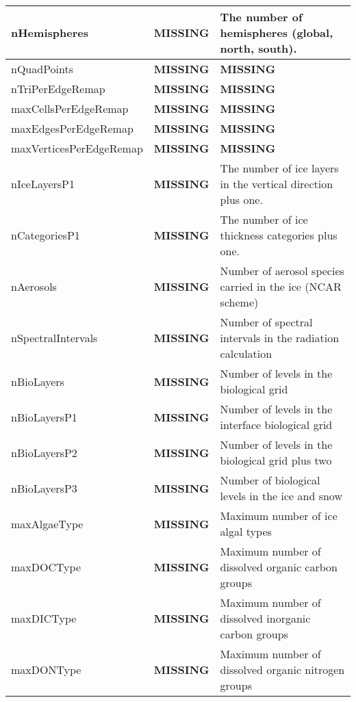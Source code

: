 {\begin{center}
\begin{longtable}{| p{1.0in} || p{1.0in} | p{4.0in} |}
    nHemispheres & {\bf \color{red} MISSING} & The number of hemispheres (global, north, south). \\ 
    \hline
    nQuadPoints & {\bf \color{red} MISSING} & {\bf \color{red} MISSING} \\ 
    \hline
    nTriPerEdgeRemap & {\bf \color{red} MISSING} & {\bf \color{red} MISSING} \\ 
    \hline
    maxCellsPerEdgeRemap & {\bf \color{red} MISSING} & {\bf \color{red} MISSING} \\ 
    \hline
    maxEdgesPerEdgeRemap & {\bf \color{red} MISSING} & {\bf \color{red} MISSING} \\ 
    \hline
    maxVerticesPerEdgeRemap & {\bf \color{red} MISSING} & {\bf \color{red} MISSING} \\ 
    \hline
    nIceLayersP1 & {\bf \color{red} MISSING} & The number of ice layers in the vertical direction plus one. \\ 
    \hline
    nCategoriesP1 & {\bf \color{red} MISSING} & The number of ice thickness categories plus one. \\ 
    \hline
    nAerosols & {\bf \color{red} MISSING} & Number of aerosol species carried in the ice (NCAR scheme) \\ 
    \hline
    nSpectralIntervals & {\bf \color{red} MISSING} & Number of spectral intervals in the radiation calculation \\ 
    \hline
    nBioLayers & {\bf \color{red} MISSING} & Number of levels in the biological grid \\ 
    \hline
    nBioLayersP1 & {\bf \color{red} MISSING} & Number of levels in the interface biological grid \\ 
    \hline
    nBioLayersP2 & {\bf \color{red} MISSING} & Number of levels in the biological grid plus two \\ 
    \hline
    nBioLayersP3 & {\bf \color{red} MISSING} & Number of biological levels in the ice and snow \\ 
    \hline
    maxAlgaeType & {\bf \color{red} MISSING} & Maximum number of ice algal types \\ 
    \hline
    maxDOCType & {\bf \color{red} MISSING} & Maximum number of dissolved organic carbon groups \\ 
    \hline
    maxDICType & {\bf \color{red} MISSING} & Maximum number of dissolved inorganic carbon groups \\ 
    \hline
    maxDONType & {\bf \color{red} MISSING} & Maximum number of dissolved organic nitrogen groups \\ 

\end{longtable}
\end{center}}
